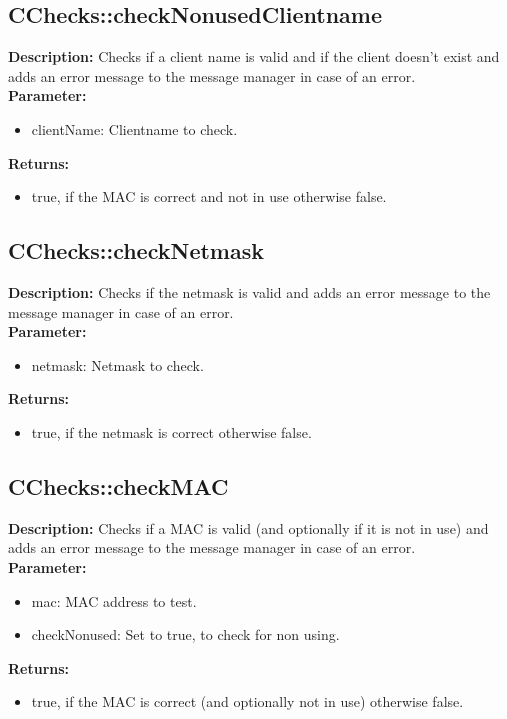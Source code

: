 \subsection{CChecks::checkNonusedClientname}
\textbf{Description:} Checks if a client name is valid and if the client doesn't exist and adds an error message to the message manager in case of an error.\\
\textbf{Parameter:}
\begin{itemize}
\item clientName: Clientname to check.
\end{itemize}
\textbf{Returns:}
\begin{itemize}
\item true, if the MAC is correct and not in use otherwise false.
\end{itemize}

\subsection{CChecks::checkNetmask}
\textbf{Description:} Checks if the netmask is valid and adds an error message to the message manager in case of an error.\\
\textbf{Parameter:}
\begin{itemize}
\item netmask: Netmask to check.
\end{itemize}
\textbf{Returns:}
\begin{itemize}
\item true, if the netmask is correct otherwise false.
\end{itemize}

\subsection{CChecks::checkMAC}
\textbf{Description:} Checks if a MAC is valid (and optionally if it is not in use) and adds an error message to the message manager in case of an error.\\
\textbf{Parameter:}
\begin{itemize}
\item mac: MAC address to test.
\item checkNonused: Set to true, to check for non using.
\end{itemize}
\textbf{Returns:}
\begin{itemize}
\item true, if the MAC is correct (and optionally not in use) otherwise false.
\end{itemize}

